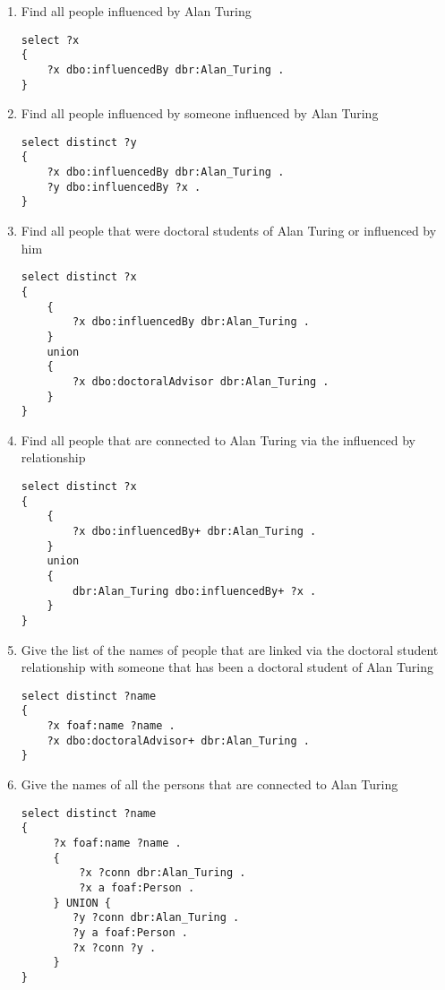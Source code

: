\documentclass[a4paper, 12pt]{report}
\begin{document}
\begin{enumerate}
\begin{lstlisting}[frame=single]
} 
\end{lstlisting}

\item Find all people influenced by Alan Turing
\begin{lstlisting}[frame=single]
select ?x
{
    ?x dbo:influencedBy dbr:Alan_Turing .
}
\end{lstlisting}

\item Find all people influenced by someone influenced by Alan Turing
\begin{lstlisting}[frame=single]
select distinct ?y
{
    ?x dbo:influencedBy dbr:Alan_Turing .
    ?y dbo:influencedBy ?x .
}
\end{lstlisting}

\item Find all people that were doctoral students of Alan Turing or influenced by him
\begin{lstlisting}[frame=single]
select distinct ?x
{
    {
        ?x dbo:influencedBy dbr:Alan_Turing .
    }
    union
    {
        ?x dbo:doctoralAdvisor dbr:Alan_Turing .
    }
}
\end{lstlisting}

\item Find all people that are connected to Alan Turing via the influenced by relationship
\begin{lstlisting}[frame=single]
select distinct ?x
{
    {
        ?x dbo:influencedBy+ dbr:Alan_Turing .
    }
    union
    {
        dbr:Alan_Turing dbo:influencedBy+ ?x .
    }
}
\end{lstlisting}

\item Give the list of the names of people that are linked via the doctoral student relationship with someone that has been a doctoral student of Alan Turing
\begin{lstlisting}[frame=single]
select distinct ?name
{
    ?x foaf:name ?name .
    ?x dbo:doctoralAdvisor+ dbr:Alan_Turing .
}
\end{lstlisting}

\item Give the names of all the persons that are connected to Alan Turing
\begin{lstlisting}[frame=single]
select distinct ?name  
{
     ?x foaf:name ?name .
     {
         ?x ?conn dbr:Alan_Turing .
         ?x a foaf:Person .
     } UNION {
        ?y ?conn dbr:Alan_Turing .
        ?y a foaf:Person .
        ?x ?conn ?y .
     }
}


\end{lstlisting}
\end{enumerate}
\end{document}
